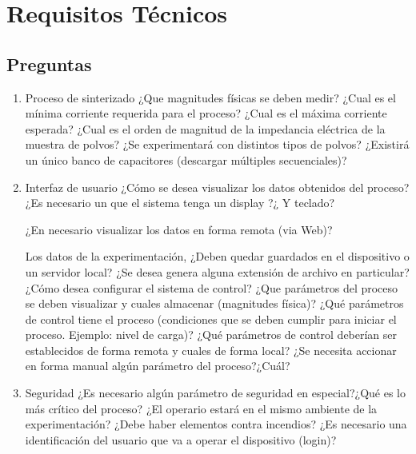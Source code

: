 \documentclass[12pt]{article}
\begin{document}
\section{Requisitos Técnicos}

\subsection{Preguntas}
  
 \begin{enumerate}
    \item Proceso de sinterizado
      \subitem ¿Que magnitudes físicas se deben medir?
      \subitem ¿Cual es el mínima corriente requerida para el proceso?
      \subitem ¿Cual es el máxima corriente esperada?
      \subitem ¿Cual es el orden de magnitud de la impedancia eléctrica de la muestra de polvos?
      \subitem ¿Se experimentará con distintos tipos de polvos?
      \subitem ¿Existirá un único banco de capacitores (descargar múltiples secuenciales)?

    \item Interfaz de usuario
      \subitem ¿Cómo se desea visualizar los datos obtenidos del proceso?
      \subitem ¿Es necesario un que el sistema tenga un display ?¿ Y teclado?
      
      \subitem ¿En necesario visualizar los datos en forma remota (via Web)?
      
      \subitem Los datos de la experimentación, ¿Deben quedar guardados en el dispositivo o un servidor local?
      \subitem ¿Se desea genera alguna extensión de archivo en particular?
      \subitem ¿Cómo desea configurar el sistema de control?
      \subsubitem ¿Que parámetros del proceso se deben visualizar y cuales almacenar (magnitudes física)?
      \subsubitem ¿Qué parámetros de control tiene el proceso (condiciones que se deben cumplir para iniciar el proceso. Ejemplo: nivel de carga)?
      \subsubitem ¿Qué parámetros de control deberían ser establecidos de forma remota y cuales de forma local?
      \subitem ¿Se necesita accionar en forma manual algún parámetro del proceso?¿Cuál?
    
    \item Seguridad
      \subitem ¿Es necesario algún parámetro de seguridad en especial?¿Qué es lo más crítico del proceso?
      \subitem ¿El operario estará en el mismo ambiente de la experimentación?
      \subitem ¿Debe haber elementos contra incendios?
      \subitem ¿Es necesario una identificación del usuario que va a operar el dispositivo (login)?
    

\end{enumerate}
\end{document}
